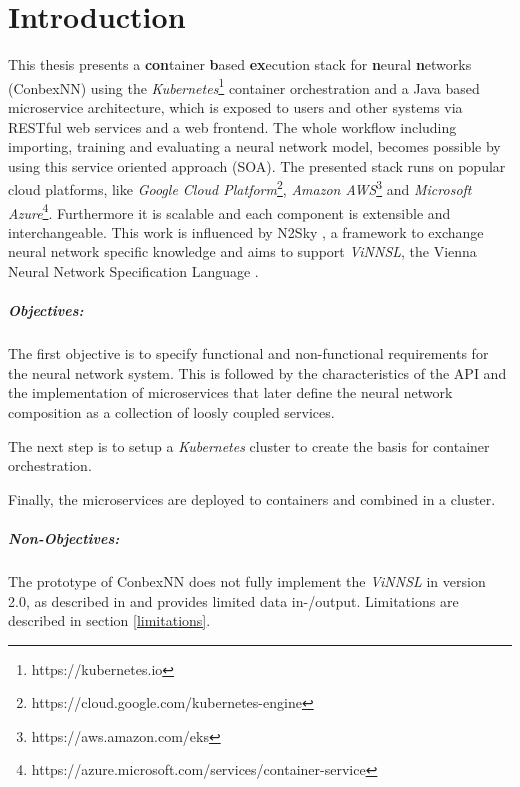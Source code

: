 \chapter{Introduction}\label{introduction}

This thesis presents a \textbf{con}tainer \textbf{b}ased
\textbf{ex}ecution stack for \textbf{n}eural \textbf{n}etworks
(ConbexNN) using the \emph{Kubernetes}\footnote{https://kubernetes.io}
container orchestration and a Java based microservice architecture,
which is exposed to users and other systems via RESTful web services and
a web frontend. The whole workflow including importing, training and
evaluating a neural network model, becomes possible by using this
service oriented approach (SOA). The presented stack runs on popular
cloud platforms, like \emph{Google Cloud Platform}\footnote{https://cloud.google.com/kubernetes-engine},
\emph{Amazon AWS}\footnote{https://aws.amazon.com/eks} and
\emph{Microsoft Azure}\footnote{https://azure.microsoft.com/services/container-service}.
Furthermore it is scalable and each component is extensible and
interchangeable. This work is influenced by N2Sky \cite{schikuta_2013},
a framework to exchange neural network specific knowledge and aims to
support \emph{ViNNSL}, the Vienna Neural Network Specification Language
\cite{kopica_2015} \cite{beran_2008}.

\paragraph{Objectives:}\label{objectives}

The first objective is to specify functional and non-functional
requirements for the neural network system. This is followed by the
characteristics of the API and the implementation of microservices that
later define the neural network composition as a collection of loosly
coupled services.

The next step is to setup a \emph{Kubernetes} cluster to create the
basis for container orchestration.

Finally, the microservices are deployed to containers and combined in a
cluster.

\paragraph{Non-Objectives:}\label{non-objectives}

The prototype of ConbexNN does not fully implement the \emph{ViNNSL} in
version 2.0, as described in \cite{kopica_2015} and provides limited
data in-/output. Limitations are described in section \ref{limitations}.

